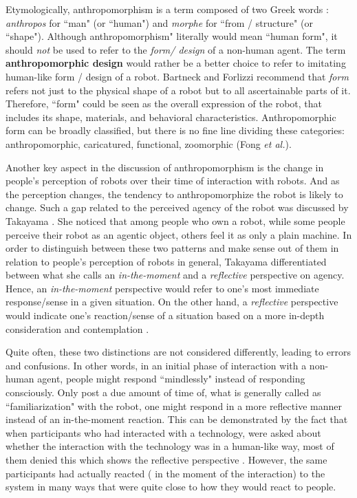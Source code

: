 \documentclass{acm_proc_article-sp}
\newcommand{\etal}{{\textit{et al.\xspace}}}
\begin{document}
Etymologically, anthropomorphism is a term composed of two Greek words :
\textit{anthropos} for ``man" (or ``human") and \textit{morphe} for ``from /
structure" (or ``shape"). Although anthropomorphism" literally would mean
``human form", it should \textit{not} be used to refer to the \textit{form/
design} of a non-human agent. The term \textbf{anthropomorphic design} would
rather be a better choice to refer to imitating human-like form / design of a
robot. Bartneck and Forlizzi\cite{bartneck_shaping_2004} recommend that \emph{form}
refers not just to the physical shape of a robot but to all ascertainable parts
of it. Therefore, ``form" could be seen as the overall expression of the robot,
that includes its shape, materials, and behavioral characteristics.
Anthropomorphic form can be broadly classified, but there is no fine line
dividing these categories: anthropomorphic, caricatured, functional,
zoomorphic (Fong \etal \cite{fong_survey_2003}).

Another key aspect in the discussion of anthropomorphism is the change in
people's perception of robots over their time of interaction with robots. And as
the perception changes, the tendency to anthropomorphize the robot is likely to
change. Such a gap related to the perceived agency of the robot was discussed by
Takayama \cite{takayama_perspectives_2012}. She noticed that among people who
own a robot, while some people perceive their robot as an agentic object, others
feel  it as only a plain machine. In order to distinguish between these two
patterns and make sense out of them in relation to people's perception of robots
in general, Takayama differentiated between what she calls an
\emph{in-the-moment} and a \emph{reflective} perspective on agency. Hence, an
\emph{in-the-moment} perspective would refer to one's most immediate
response/sense in a given situation. On the other hand, a \emph{reflective}
perspective would indicate one's reaction/sense of a situation based on a more
in-depth  consideration and contemplation \cite{takayama_perspectives_2012}. 

Quite often, these two distinctions are not considered differently, leading to
errors and confusions.  In other words, in an initial phase of interaction with
a non-human agent, people might respond ``mindlessly" instead of responding
consciously\cite{nass_machines_2000}. Only post a due amount of
time of, what is generally called as ``familiarization" with the robot, one
might respond in a more reflective manner instead of an in-the-moment reaction.
This can be demonstrated by the fact that when participants who had interacted
with a technology, were asked about whether the interaction with the technology
was in a human-like way, most of them denied this which shows the reflective
perspective . However, the same participants had actually reacted ( in the
moment of the interaction) to the system in many ways that were quite close to
how they would react to people\cite{reeves_media_1996}.
\end{document}
